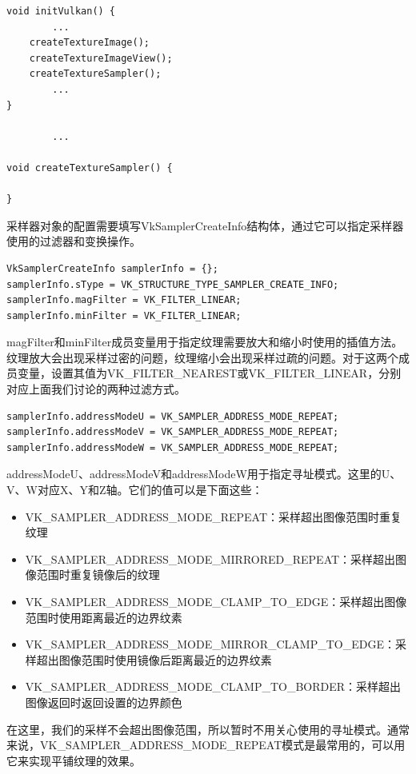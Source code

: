 \documentclass{ctexart}
\begin{document}
\begin{lstlisting}[language={[ANSI]C}]
void initVulkan() {
		...
	createTextureImage();
	createTextureImageView();
	createTextureSampler();
		...
}

		...

void createTextureSampler() {

}
\end{lstlisting}

采样器对象的配置需要填写VkSamplerCreateInfo结构体，通过它可以指定采样器使用的过滤器和变换操作。

\begin{lstlisting}[language={[ANSI]C}]
VkSamplerCreateInfo samplerInfo = {};
samplerInfo.sType = VK_STRUCTURE_TYPE_SAMPLER_CREATE_INFO;
samplerInfo.magFilter = VK_FILTER_LINEAR;
samplerInfo.minFilter = VK_FILTER_LINEAR;
\end{lstlisting}

magFilter和minFilter成员变量用于指定纹理需要放大和缩小时使用的插值方法。纹理放大会出现采样过密的问题，纹理缩小会出现采样过疏的问题。对于这两个成员变量，设置其值为VK\_FILTER\_NEAREST或VK\_FILTER\_LINEAR，分别对应上面我们讨论的两种过滤方式。

\begin{lstlisting}[language={[ANSI]C}]
samplerInfo.addressModeU = VK_SAMPLER_ADDRESS_MODE_REPEAT;
samplerInfo.addressModeV = VK_SAMPLER_ADDRESS_MODE_REPEAT;
samplerInfo.addressModeW = VK_SAMPLER_ADDRESS_MODE_REPEAT;
\end{lstlisting}

addressModeU、addressModeV和addressModeW用于指定寻址模式。这里的U、V、W对应X、Y和Z轴。它们的值可以是下面这些：

\begin{itemize}
	\item VK\_SAMPLER\_ADDRESS\_MODE\_REPEAT：采样超出图像范围时重复纹理
	\item VK\_SAMPLER\_ADDRESS\_MODE\_MIRRORED\_REPEAT：采样超出图像范围时重复镜像后的纹理
	\item VK\_SAMPLER\_ADDRESS\_MODE\_CLAMP\_TO\_EDGE：采样超出图像范围时使用距离最近的边界纹素
	\item VK\_SAMPLER\_ADDRESS\_MODE\_MIRROR\_CLAMP\_TO\_EDGE：采样超出图像范围时使用镜像后距离最近的边界纹素
	\item VK\_SAMPLER\_ADDRESS\_MODE\_CLAMP\_TO\_BORDER：采样超出图像返回时返回设置的边界颜色
\end{itemize}

在这里，我们的采样不会超出图像范围，所以暂时不用关心使用的寻址模式。通常来说，VK\_SAMPLER\_ADDRESS\_MODE\_REPEAT模式是最常用的，可以用它来实现平铺纹理的效果。
\end{document}
